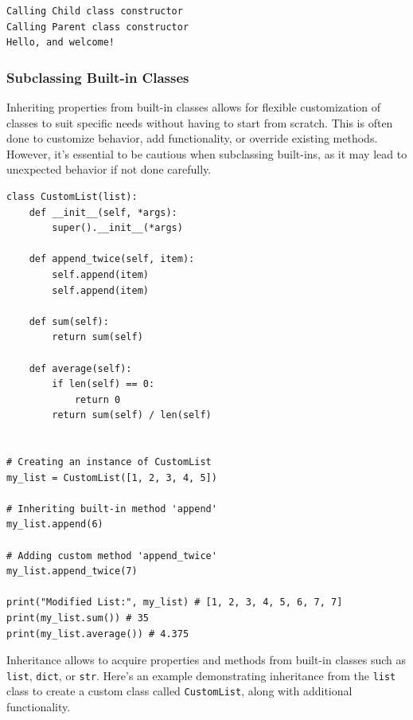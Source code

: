 \begin{verbatim}
Calling Child class constructor
Calling Parent class constructor
Hello, and welcome!
\end{verbatim}

\newpage
\subsubsection{Subclassing Built-in Classes}
Inheriting properties from built-in classes allows for flexible customization of classes to suit specific needs without having to start from scratch. This is often done to customize behavior, add functionality, or override existing methods. However, it's essential to be cautious when subclassing built-ins, as it may lead to unexpected behavior if not done carefully.

\begin{codebox}
\begin{verbatim}
class CustomList(list):
    def __init__(self, *args):
        super().__init__(*args)

    def append_twice(self, item):
        self.append(item)
        self.append(item)
    
    def sum(self):
        return sum(self)
    
    def average(self):
        if len(self) == 0:
            return 0
        return sum(self) / len(self)


# Creating an instance of CustomList
my_list = CustomList([1, 2, 3, 4, 5])

# Inheriting built-in method 'append'
my_list.append(6)

# Adding custom method 'append_twice'
my_list.append_twice(7)

print("Modified List:", my_list) # [1, 2, 3, 4, 5, 6, 7, 7]
print(my_list.sum()) # 35
print(my_list.average()) # 4.375
\end{verbatim}
\end{codebox}

Inheritance allows to acquire properties and methods from built-in classes such as \texttt{list}, \texttt{dict}, or \texttt{str}. Here's an example demonstrating inheritance from the \texttt{list} class to create a custom class called \texttt{CustomList}, along with additional functionality.

